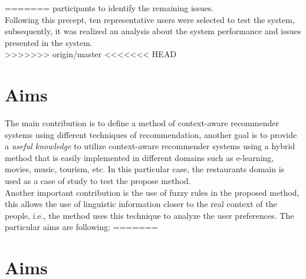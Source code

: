 =======
participants to identify the remaining issues\cite{albert2013measuring}.\\
Following this precept, ten representative users were selected to test 
the system, subsequently, it was realized an analysis about the 
system performance and issues presented in the system.\\
>>>>>>> origin/master
%
%
<<<<<<< HEAD

\section{Aims}

The main contribution is to define a method of context-aware
recommender systems using different techniques of recommendation,
another goal is to provide a \textit{useful knowledge} 
to utilize context-aware recommender systems
using a hybrid method that is easily implemented in different domains
such as e-learning, movies, music, tourism, etc. In this particular
case, the restaurants domain is used as a case of study to test the
propose method. \\ Another important contribution is the use of fuzzy rules in the
proposed method, this allows the use of linguistic
information closer to the real context of the people, i.e., 
the method uses this technique to analyze the user preferences.
The particular aims are following:
=======
\section{Aims}

